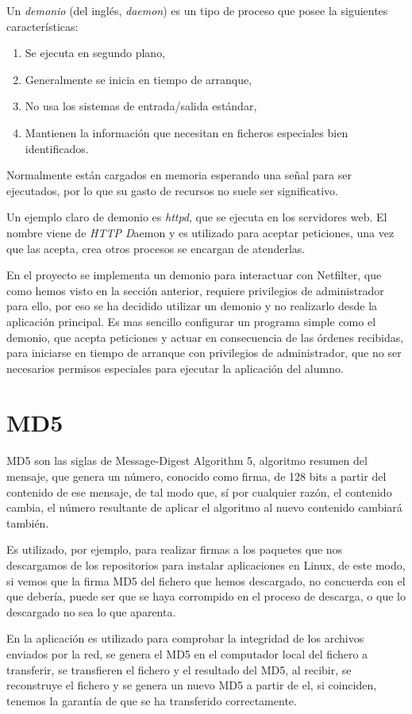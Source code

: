 Un \emph{demonio} (del inglés, \emph{daemon}\cite{SO:2006}) es un tipo de proceso que posee la siguientes características:

\begin{enumerate}
	\item Se ejecuta en segundo plano,
	\item Generalmente se inicia en tiempo de arranque,
	\item No usa los sistemas de entrada/salida est\'andar,
	\item Mantienen la información que necesitan en ficheros especiales bien identificados.
\end{enumerate}

Normalmente est\'an cargados en memoria esperando una señal para ser ejecutados, por lo que su gasto de recursos no suele ser significativo.
\newline


Un ejemplo claro de demonio es \emph{httpd}, que se ejecuta en los servidores web. El nombre viene de \emph{HTTP D}aemon y es utilizado para aceptar peticiones, una vez que las acepta, crea otros procesos se encargan de atenderlas.
\newline

En el proyecto se implementa un demonio para interactuar con Netfilter, que como hemos visto en la sección anterior, requiere privilegios de administrador para ello, por eso se ha decidido utilizar un demonio y no realizarlo desde la aplicación principal. Es mas sencillo configurar un programa simple como el demonio, que acepta peticiones y actuar en consecuencia de las órdenes recibidas, para iniciarse en tiempo de arranque con privilegios de administrador, que no ser necesarios permisos especiales para ejecutar la aplicación del alumno.


\section{MD5}

MD5\cite{MD5:2007} son las siglas de Message-Digest Algorithm 5, algoritmo resumen del mensaje, que genera un número, conocido como firma, de 128 bits a partir del contenido de ese mensaje, de tal modo que, sí por cualquier razón, el contenido cambia, el número resultante de aplicar el algoritmo al nuevo contenido cambiará también.
\newline

Es utilizado, por ejemplo, para realizar firmas a los paquetes que nos descargamos de los repositorios para instalar aplicaciones en Linux, de este modo, si vemos que la firma MD5 del fichero que hemos descargado, no concuerda con el que debería, puede ser que se haya corrompido en el proceso de descarga, o que lo descargado no sea lo que aparenta.
\newline

En la aplicación es utilizado para comprobar la integridad de los archivos enviados por la red, se genera el MD5 en el computador local del fichero a transferir, se transfieren el fichero y el resultado del MD5, al recibir, se reconstruye el fichero y se genera un nuevo MD5 a partir de el, si coinciden, tenemos la garantía de que se ha transferido correctamente.

